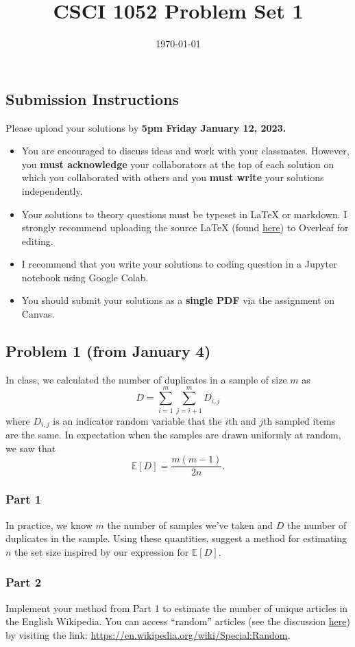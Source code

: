 \documentclass{article}
\title{CSCI 1052 Problem Set 1}
\author{} %
\date{\today}
\begin{document}
\maketitle

\subsection*{Submission Instructions}

Please upload your solutions by
\textbf{5pm Friday January 12, 2023.}
\begin{itemize}
\item You are encouraged to discuss ideas
and work with your classmates. However, you
\textbf{must acknowledge} your collaborators
at the top of each solution on which
you collaborated with others 
and you \textbf{must write} your solutions
independently.
\item Your solutions to theory questions must
be typeset in LaTeX or markdown.
I strongly recommend uploading the source LaTeX (found 
\href{https://www.rtealwitter.com/rads2024/files/pset1.tex}{here})
to Overleaf for editing.
\item I recommend that you write your solutions to coding question in a Jupyter notebook using Google Colab.
\item You should submit your solutions as a \textbf{single PDF} via the assignment on Canvas.
\end{itemize}

\subsection*{Problem 1 (from January 4)}
In class, we calculated the number of duplicates in a sample of size $m$ as
$$
D = \sum_{i=1}^m \sum_{j=i+1}^m D_{i,j}
$$
where $D_{i,j}$ is an indicator random variable that the $i$th and $j$th sampled items are the same.
In expectation when the samples are drawn uniformly at random, we saw that
$$
\mathbb{E}[D] = \frac{m (m-1)}{2 n}.
$$

\subsubsection*{Part 1} 
In practice, we know $m$ the number of samples we've taken and $D$ the number of duplicates in the sample.
Using these quantities, suggest a method for estimating $n$ the set size inspired by our expression for $\mathbb{E}[D]$.

\subsubsection*{Part 2}
Implement your method from Part 1 to estimate the number of unique articles in the English Wikipedia.
You can access ``random'' articles (see the discussion \href{https://en.wikipedia.org/wiki/Wikipedia:FAQ/Technical#random}{here}) by visiting the link: \url{https://en.wikipedia.org/wiki/Special:Random}.
\end{document}
